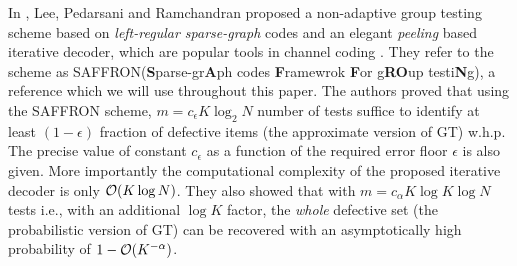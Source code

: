 \documentclass[conference,twocolumn]{IEEEtran}
\begin{document}
In \cite{lee2015saffron}, Lee, Pedarsani and Ramchandran proposed a non-adaptive group testing scheme based on \textit{left-regular sparse-graph} codes and an elegant \textit{peeling} based iterative decoder, which are popular tools in channel coding \cite{richardson2008modern}. They refer to the scheme as SAFFRON(\textbf{S}parse-gr\textbf{A}ph codes \textbf{F}ramewrok \textbf{F}or g\textbf{RO}up testi\textbf{N}g), a reference which we will use throughout this paper. The authors proved that using the SAFFRON scheme, $m=c_\epsilon K\log_2 N$ number of tests suffice to identify at least $(1-\epsilon)$ fraction of defective items (the approximate version of GT) w.h.p. The precise value of constant $c_\epsilon$ as a function of the required error floor $\epsilon$ is also given. More importantly the computational complexity of the proposed iterative decoder is only $\mathcal{O}(K\log N)$. They also showed that with $m=c_\alpha K\log K \log N$ tests  i.e., with an additional $\log K$ factor, the \textit{whole} defective set (the probabilistic version of GT) can be recovered with an asymptotically high probability of $1-\mathcal{O}(K^{-\alpha})$.
\end{document}
